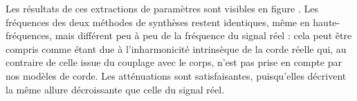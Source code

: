 Les résultats de ces extractions de paramètres sont visibles en figure \label{apo}. Les fréquences des deux méthodes de synthèses restent identiques, même en haute-fréquences, mais différent peu à peu de la fréquence du signal réel : cela peut être compris comme étant due à l'inharmonicité intrinsèque de la corde réelle qui, au contraire de celle issue du couplage avec le corps, n'est pas prise en compte par nos modèles de corde. Les atténuations sont satisfaisantes, puisqu'elles décrivent la même allure décroissante que celle du signal réel.

